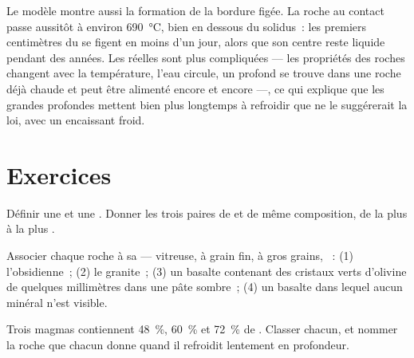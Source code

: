 Le modèle montre aussi la formation de la bordure figée. La roche au contact
passe aussitôt à environ \qty{690}{\degreeCelsius}, bien en dessous du
solidus~: les premiers centimètres du  se figent en moins d'un jour,
alors que son centre reste liquide pendant des années. Les 
réelles sont plus compliquées --- les propriétés des roches changent avec
la température, l'eau circule, un  profond se trouve dans une roche
déjà chaude et peut être alimenté encore et encore ---, ce qui explique que
les grandes  profondes mettent bien plus longtemps à refroidir que
ne le suggérerait la loi, avec un encaissant froid.

\section{Exercices}

\begin{exercise}[$\star$]\label{exo:g11:igneous-rocks:1}
Définir une  et une . Donner les trois
paires de  et  de même composition, de la plus
 à la plus .
\end{exercise}

\begin{exercise}[$\star$]\label{exo:g11:igneous-rocks:2}
Associer chaque roche à sa  --- vitreuse, à grain fin, à gros
grains, ~: (1) l'obsidienne~; (2) le granite~; (3) un basalte
contenant des cristaux verts d'olivine de quelques millimètres dans une pâte
sombre~; (4) un basalte dans lequel aucun minéral n'est visible.
\end{exercise}

\begin{exercise}[$\star$]\label{exo:g11:igneous-rocks:3}
Trois magmas contiennent \qty{48}{\percent}, \qty{60}{\percent} et
\qty{72}{\percent} de . Classer chacun, et nommer la roche que
chacun donne quand il refroidit lentement en profondeur.
\end{exercise}

